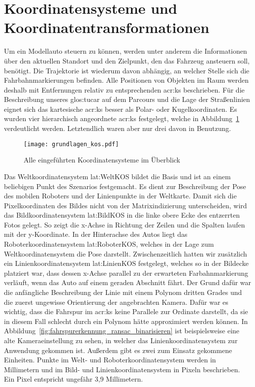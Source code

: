\section{Koordinatensysteme und Koordinatentransformationen} \label{sec:ks}

Um ein Modellauto steuern zu können, werden unter anderem die Informationen über den aktuellen Standort und den Zielpunkt, den das Fahrzeug ansteuern soll, benötigt. Die Trajektorie ist wiederum davon abhängig, an welcher Stelle sich die Fahrbahnmarkierungen befinden. Alle Positionen von Objekten im Raum werden deshalb mit Entfernungen relativ zu entsprechenden \gls{acr:ks} beschrieben. Für die Beschreibung unseres \gls{glos:tucar} auf dem Parcours und die Lage der Straßenlinien eignet sich das kartesische \gls{acr:ks} besser als Polar- oder Kugelkoordinaten. Es wurden vier hierarchisch angeordnete \gls{acr:ks} festgelegt, welche in Abbildung~\ref{fig:grundlagen_kos} verdeutlicht werden. Letztendlich waren aber nur drei davon in Benutzung. 

\begin{figure}[H] %
  \centering
  \texttt{[image: grundlagen\_kos.pdf]}
  \caption{Alle eingeführten Koordinatensysteme im Überblick}
  \label{fig:grundlagen_kos}
\end{figure}

Das Weltkoordinatensystem \gls{lat:WeltKOS} bildet die Basis und ist an einem beliebigen Punkt des Szenarios festgemacht. Es dient zur Beschreibung der Pose des mobilen Roboters und der Linienpunkte in der Weltkarte. Damit sich die Pixelkoordinaten des Bildes nicht von der Matrixindizierung unterscheiden, wird das Bildkoordinatensystem \gls{lat:BildKOS} in die linke obere Ecke des entzerrten Fotos gelegt. So zeigt die x-Achse in Richtung der Zeilen und die Spalten laufen mit der y-Koordinate. In der Hinterachse des Autos liegt das Roboterkoordinatensystem \gls{lat:RoboterKOS}, welches in der Lage zum Weltkoordinatensystem die Pose darstellt. Zwischenzeitlich hatten wir zusätzlich ein Linienkoordinatensystem \gls{lat:LinienKOS} festgelegt, welches so in der Bildecke platziert war, dass dessen x-Achse parallel zu der erwarteten Farbahnmarkierung verläuft, wenn das Auto auf einem geraden Abschnitt fährt. Der Grund dafür war die anfängliche Beschreibung der Linie mit einem Polynom dritten Grades und die zuerst ungewisse Orientierung der angebrachten Kamera. Dafür war es wichtig, dass die Fahrspur im \gls{acr:ks} keine Parallele zur Ordinate darstellt, da sie in diesem Fall schlecht durch ein Polynom hätte approximiert werden können. In Abbildung~\ref{fig:fahrspurerkennung_ransac_binarisieren} ist beispielsweise eine alte Kameraeinstellung zu sehen, in welcher das Linienkoordinatensystem zur Anwendung gekommen ist. Außerdem gibt es zwei zum Einsatz gekommene Einheiten. Punkte im Welt- und Roboterkoordinatensystem werden in Millimetern und im Bild- und Linienkoordinatensystem in Pixeln beschrieben. Ein Pixel entspricht ungefähr 3,9 Millimetern.

